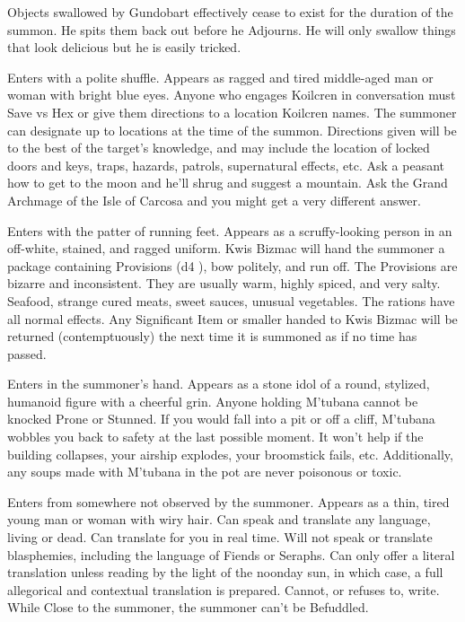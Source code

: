 {Objects swallowed by Gundobart effectively cease to exist for the duration of the summon. He spits them back out before he Adjourns. He will only swallow things that look delicious but he is easily tricked.

Enters with a polite shuffle. Appears as ragged and tired middle-aged man or woman with bright blue eyes. Anyone who engages Koilcren in conversation must Save vs Hex or give them directions to a location Koilcren names. The summoner can designate up to \DICE locations at the time of the summon. Directions given will be to the best of the target's knowledge, and may include the location of locked doors and keys, traps, hazards, patrols, supernatural effects, etc. Ask a peasant how to get to the moon and he'll shrug and suggest a mountain. Ask the Grand Archmage of the Isle of Carcosa and you might get a very different answer.  



Enters with the patter of running feet. Appears as a scruffy-looking person in an off-white, stained, and ragged uniform. Kwis Bizmac will hand the summoner a package containing \DICE Provisions (d4 \UD), bow politely, and run off. The Provisions are bizarre and inconsistent. They are usually warm, highly spiced, and very salty. Seafood, strange cured meats, sweet sauces, unusual vegetables. The rations have all normal effects. Any Significant Item or smaller handed to Kwis Bizmac will be returned (contemptuously) the next time it is summoned as if no time has passed.


Enters in the summoner's hand. Appears as a stone idol of a round, stylized, humanoid figure with a cheerful grin. Anyone holding M'tubana cannot be knocked Prone or Stunned.  If you would fall into a pit or off a cliff, M'tubana wobbles you back to safety at the last possible moment. It won't help if the building collapses, your airship explodes, your broomstick fails, etc. Additionally, any soups made with M'tubana in the pot are never poisonous or toxic.


Enters from somewhere not observed by the summoner. Appears as a thin, tired young man or woman with wiry hair. Can speak and translate any language, living or dead.  Can translate for you in real time. Will not speak or translate blasphemies, including the language of Fiends or Seraphs.  Can only offer a literal translation unless reading by the light of the noonday sun, in which case, a full allegorical and contextual translation is prepared. Cannot, or refuses to, write.  While Close to the summoner, the summoner can't be Befuddled.


}
